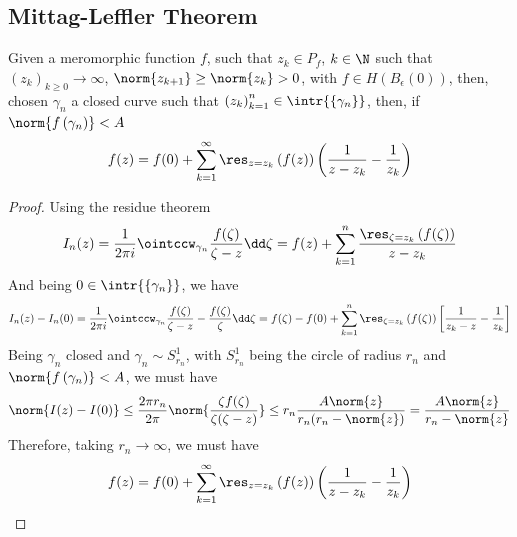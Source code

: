\documentclass[../mmf.tex]{subfiles}
\begin{document}
\subsection{Mittag-Leffler Theorem}
\begin{thm}
	Given a meromorphic function $f$, such that $z_k\in P_f$, $k\in\N$ such that $(z_k)_{k\ge0}\to\infty$, $\norm{z_{k+1}}\ge\norm{z_k}>0$, with $f\in H\left( B_\epsilon(0) \right)$, then, chosen $\gamma_n$ a closed curve such that $\left( z_k \right)_{k=1}^n\in\intr{ \left\{ \gamma_n \right\} }$, then, if $\norm{f\left( \gamma_n \right)}<A$
	\begin{equation}
		f(z)=f(0)+\sum_{k=1}^{\infty}\res_{z=z_k}\left( f(z) \right)\left( \frac{1}{z-z_k}-\frac{1}{z_k} \right)
		\label{eq:mittaglefflerrep}
	\end{equation}
\end{thm}
\begin{proof}
	Using the residue theorem
	\begin{equation*}
		I_n(z)=\frac{1}{2\pi i}\ointccw_{\gamma_n}\frac{f(\zeta)}{\zeta-z}\dd\zeta=f(z)+\sum_{k=1}^{n}\frac{\res_{\zeta=z_k}\left( f(\zeta) \right)}{z-z_k}
	\end{equation*}
	And being $0\in\intr{ \left\{ \gamma_n \right\} }$, we have
	\begin{equation*}
		I_n(z)-I_n(0)=\frac{1}{2\pi i}\ointccw_{\gamma_n}\frac{f(\zeta)}{\zeta-z}-\frac{f(\zeta)}{\zeta}\dd\zeta=f(\zeta)-f(0)+\sum_{k=1}^{n}\res_{\zeta=z_k}\left( f(\zeta) \right)\left[ \frac{1}{z_k-z}-\frac{1}{z_k} \right]
	\end{equation*}
	Being $\gamma_n$ closed and $\gamma_n\sim S^1_{r_n}$, with $S^1_{r_n}$ being the circle of radius $r_n$ and $\norm{f\left( \gamma_n \right)}<A$, we must have
	\begin{equation*}
		\norm{ I(z)-I(0) }\le\frac{2\pi r_n}{2\pi}\norm{ \frac{\zeta f(\zeta)}{\zeta(\zeta-z)} }\le r_n\frac{A\norm{z}}{r_n(r_n-\norm{z})}=\frac{A\norm{z}}{r_n-\norm{z}}
	\end{equation*}
	Therefore, taking $r_n\to\infty$, we must have
	\begin{equation*}
		f(z)=f(0)+\sum_{k=1}^{\infty}\res_{z=z_k}\left( f(z) \right)\left( \frac{1}{z-z_k}-\frac{1}{z_k} \right)
	\end{equation*}
\end{proof}
\end{document}
